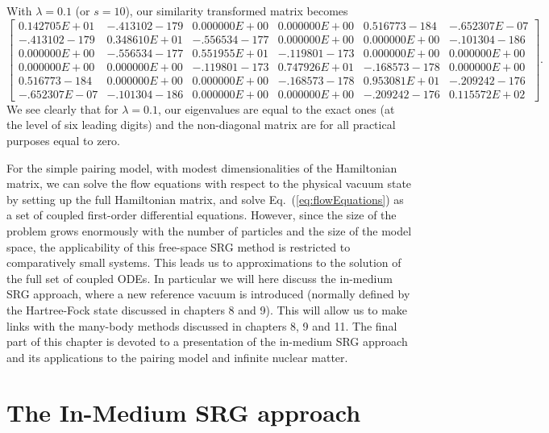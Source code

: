 With $\lambda=0.1$ (or $s=10$), our similarity transformed matrix becomes
\[
\begin{bmatrix}
0.142705E+01 &   -.413102-179 &   0.000000E+00 &   0.000000E+00 &   0.516773-184 &   -.652307E-07 \\
    -.413102-179   &  0.348610E+01  &   -.556534-177  &   0.000000E+00  &   0.000000E+00  &   -.101304-186 \\
    0.000000E+00   &  -.556534-177  &   0.551955E+01   &  -.119801-173  &   0.000000E+00   &  0.000000E+00 \\
    0.000000E+00   &  0.000000E+00   &  -.119801-173   &  0.747926E+01   &  -.168573-178   &  0.000000E+00 \\
    0.516773-184   &  0.000000E+00   &  0.000000E+00   &  -.168573-178   &  0.953081E+01   &  -.209242-176 \\
    -.652307E-07   &  -.101304-186   &  0.000000E+00   &  0.000000E+00   &  -.209242-176   &  0.115572E+02
\end{bmatrix}.
\]
We see clearly that for $\lambda=0.1$, our eigenvalues are equal to
the exact ones (at the level of six leading digits) and the
non-diagonal matrix are for all practical purposes equal to zero.

For the simple pairing model, with modest dimensionalities of the
Hamiltonian matrix, we can solve the flow equations with respect to
the physical vacuum state by setting up the full Hamiltonian matrix,
and solve Eq.~(\ref{eq:flowEquations}) as a set of coupled first-order
differential equations. However, since the size of the problem grows
enormously with the number of particles and the size of the model
space, the applicability of this free-space SRG method is restricted
to comparatively small systems. This leads us to approximations to the
solution of the full set of coupled ODEs. In particular we will here
discuss the in-medium SRG approach, where a new reference vacuum is
introduced (normally defined by the Hartree-Fock state discussed in
chapters 8 and 9). This will allow us to make links with the many-body
methods discussed in chapters 8, 9 and 11. The final part of this
chapter is devoted to a presentation of the in-medium SRG approach and
its applications to the pairing model and infinite nuclear matter.


\section{The In-Medium SRG approach}



